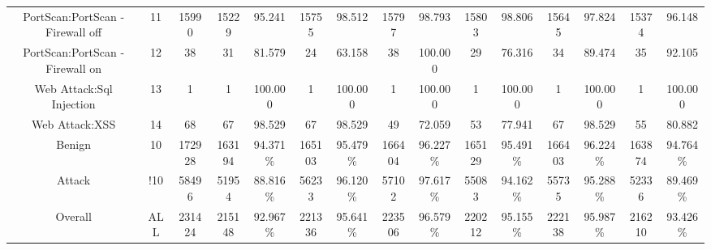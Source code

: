 \begin{table}[htb]
\begin{tabular}{@{}ccccccccccccccc@{}}
        PortScan:PortScan - Firewall off &  11 &  15990 &  15229 &  95.241 &  15755 &  98.512 &  15797 &  98.793 &  15803 &  98.806 &  15645 &  97.824 &  15374 &  96.148 \\
        PortScan:PortScan - Firewall on &  12 &  38 &  31 &  81.579 &  24 &  63.158 &  38 &  100.000 &  29 &  76.316 &  34 &  89.474 &  35 &  92.105 \\
        Web Attack:Sql Injection &  13 &  1 &  1 &  100.000 &  1 &  100.000 &  1 &  100.000 &  1 &  100.000 &  1 &  100.000 &  1 &  100.000 \\
        Web Attack:XSS &  14 &  68 &  67 &  98.529 &  67 &  98.529 &  49 &  72.059 &  53 &  77.941 &  67 &  98.529 &  55 &  80.882 \\
        Benign &  10 &  172928 &  163194 &  94.371\% &  165103 &  95.479\% &  166404 &  96.227\% &  165129 &  95.491\% &  166403 &  96.224\% &  163874 &  94.764\% \\
        Attack &  !10 &  58496 &  51954 &  88.816\% &  56233 &  96.120\% &  57102 &  97.617\% &  55083 &  94.162\% &  55735 &  95.288\% &  52336 &  89.469\% \\
        Overall &  ALL &  231424 &  215148 &  92.967\% &  221336 &  95.641\% &  223506 &  96.579\% &  220212 &  95.155\% &  222138 &  95.987\% &  216210 &  93.426\% \\
        \bottomrule
    \end{tabular}
\end{table}
